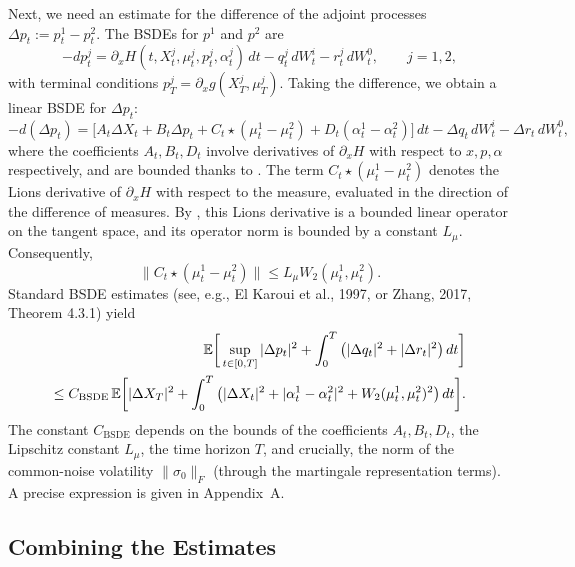 Next, we need an estimate for the difference of the adjoint processes
$\Delta p_t := p_t^1 - p_t^2$. The BSDEs for $p^1$ and $p^2$ are
\[
    -dp_t^j = \partial_x H(t, X_t^j, \mu_t^j, p_t^j, \alpha_t^j)\, dt - q_t^j\, dW_t^i
    - r_t^j\, dW_t^0, \qquad j = 1, 2,
\]
with terminal conditions $p_T^j = \partial_x g(X_T^j, \mu_T^j)$. Taking the difference,
we obtain a linear BSDE for $\Delta p_t$:
\begin{equation}
    -d(\Delta p_t) = \big[A_t \Delta X_t + B_t \Delta p_t + C_t \star (\mu_t^1 -
    \mu_t^2) + D_t (\alpha_t^1 - \alpha_t^2)\big]\, dt - \Delta q_t\, dW_t^i -
    \Delta r_t\, dW_t^0,
    \label{eq:adjoint-difference-bsde}
\end{equation}
where the coefficients $A_t, B_t, D_t$ involve derivatives of $\partial_x H$ with
respect to $x, p, \alpha$ respectively, and are bounded thanks to
. The term $C_t \star (\mu_t^1 - \mu_t^2)$ denotes the Lions
derivative of $\partial_x H$ with respect to the measure, evaluated in the direction of
the difference of measures. By , this Lions derivative is a
bounded linear operator on the tangent space, and its operator norm is bounded by a
constant $L_\mu$. Consequently,
\begin{equation}
    \|C_t \star (\mu_t^1 - \mu_t^2)\| \leq L_\mu W_2(\mu_t^1, \mu_t^2).
    \label{eq:lions-derivative-bound}
\end{equation}
Standard BSDE estimates (see, e.g., El Karoui et al., 1997, or Zhang, 2017, Theorem
4.3.1) yield
\begin{align}
    \mathbb{E}\bigg[\sup_{t \in [0,T]} |\Delta p_t|^2 + \int_0^T \big(|\Delta q_t|^2 +
    |\Delta r_t|^2\big)\, dt\bigg] \notag\\
    \leq C_{\mathrm{BSDE}} \,\mathbb{E}\bigg[|\Delta X_T|^2
    + \int_0^T \big(|\Delta X_t|^2 + |\alpha_t^1 - \alpha_t^2|^2
    + W_2(\mu_t^1, \mu_t^2)^2\big)\, dt\bigg].
    \label{eq:bsde-estimate}
\end{align}
The constant $C_{\mathrm{BSDE}}$ depends on the bounds of the coefficients
$A_t, B_t, D_t$, the Lipschitz constant $L_\mu$, the time horizon $T$, and crucially,
the norm of the common-noise volatility $\|\sigma_0\|_F$ (through the martingale
representation terms). A precise expression is given in Appendix~A.

\subsection{Combining the Estimates}

